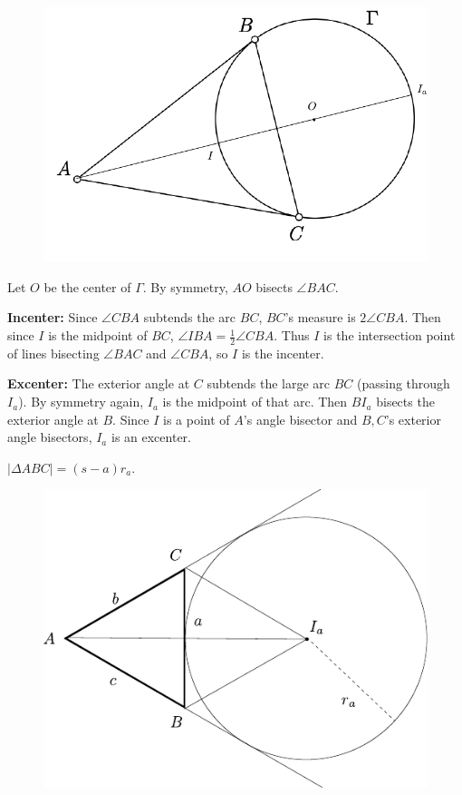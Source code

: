 \documentclass[twoside,10pt]{article}
\begin{document}
\begin{figure}[H]
	\centering
	\includegraphics[scale=0.7]{fig/79.pdf}
\end{figure}

Let $O$ be the center of $\Gamma$. By symmetry, $AO$ bisects $\angle BAC$.

\textbf{Incenter:} Since $\angle CBA$ subtends the arc $BC$, $BC$'s measure is $2\angle CBA$. Then since $I$ is the midpoint of $BC$, $\angle IBA = \frac{1}{2} \angle CBA$. Thus $I$ is the intersection point of lines bisecting $\angle BAC$ and $\angle CBA$, so $I$ is the incenter.

\textbf{Excenter:} The exterior angle at $C$ subtends the large arc $BC$ (passing through $I_{a}$). By symmetry again, $I_{a}$ is the midpoint of that arc. Then $BI_{a}$ bisects the exterior angle at $B$. Since $I$ is a point of $A$'s angle bisector and $B,C$'s exterior angle bisectors, $I_{a}$ is an excenter.

\newpage

\begin{exer}[1.80]
	$|\Delta ABC| = (s-a)r_{a}$.
\end{exer}

\begin{figure}[H]
	\centering
	\includegraphics[scale=1]{fig/80.pdf}
\end{figure}
\end{document}

